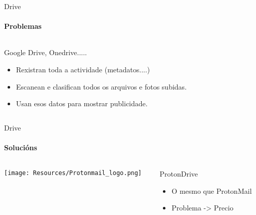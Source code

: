 \documentclass{beamer}
\begin{document}


\begin{frame}{Drive}
  \framesubtitle{Problemas}

  \begin{columns}

    \begin{column}{0.5\textwidth}
      \begin{block}{Google Drive, Onedrive.....}
        \begin{itemize}
          \item Rexistran toda a actividade (metadatos....)
          \item Escanean e clasifican todos os arquivos e fotos subidas.
          \item Usan esos datos para mostrar publicidade.
        \end{itemize}
      \end{block}

    \end{column}

  \end{columns}

\end{frame}



\begin{frame}{Drive}
  \framesubtitle{Solucións}

  \begin{columns}
    \begin{column}{0.5\textwidth}
      \texttt{[image: Resources/Protonmail\_logo.png]}

      \vspace{1cm}


    \end{column}

    \begin{column}{0.4\textwidth}
      \begin{block}{ProtonDrive}
        \begin{itemize}
          \item O mesmo que ProtonMail
          \item Problema -> Precio
        \end{itemize}
      \end{block}

    \end{column}

  \end{columns}


\end{frame}
\end{document}
